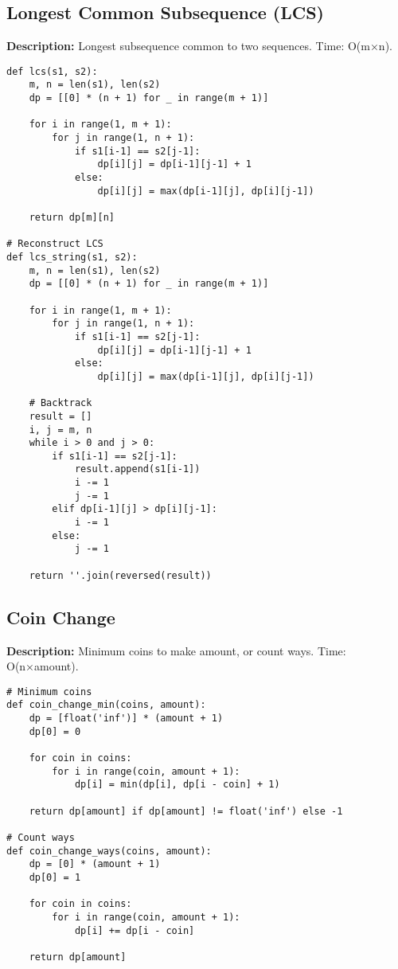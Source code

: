 \subsection{Longest Common Subsequence (LCS)}
\textbf{Description:} Longest subsequence common to two sequences. Time: O(m×n).

\begin{lstlisting}
def lcs(s1, s2):
    m, n = len(s1), len(s2)
    dp = [[0] * (n + 1) for _ in range(m + 1)]
    
    for i in range(1, m + 1):
        for j in range(1, n + 1):
            if s1[i-1] == s2[j-1]:
                dp[i][j] = dp[i-1][j-1] + 1
            else:
                dp[i][j] = max(dp[i-1][j], dp[i][j-1])
    
    return dp[m][n]

# Reconstruct LCS
def lcs_string(s1, s2):
    m, n = len(s1), len(s2)
    dp = [[0] * (n + 1) for _ in range(m + 1)]
    
    for i in range(1, m + 1):
        for j in range(1, n + 1):
            if s1[i-1] == s2[j-1]:
                dp[i][j] = dp[i-1][j-1] + 1
            else:
                dp[i][j] = max(dp[i-1][j], dp[i][j-1])
    
    # Backtrack
    result = []
    i, j = m, n
    while i > 0 and j > 0:
        if s1[i-1] == s2[j-1]:
            result.append(s1[i-1])
            i -= 1
            j -= 1
        elif dp[i-1][j] > dp[i][j-1]:
            i -= 1
        else:
            j -= 1
    
    return ''.join(reversed(result))
\end{lstlisting}

\subsection{Coin Change}
\textbf{Description:} Minimum coins to make amount, or count ways. Time: O(n×amount).

\begin{lstlisting}
# Minimum coins
def coin_change_min(coins, amount):
    dp = [float('inf')] * (amount + 1)
    dp[0] = 0
    
    for coin in coins:
        for i in range(coin, amount + 1):
            dp[i] = min(dp[i], dp[i - coin] + 1)
    
    return dp[amount] if dp[amount] != float('inf') else -1

# Count ways
def coin_change_ways(coins, amount):
    dp = [0] * (amount + 1)
    dp[0] = 1
    
    for coin in coins:
        for i in range(coin, amount + 1):
            dp[i] += dp[i - coin]
    
    return dp[amount]
\end{lstlisting}


